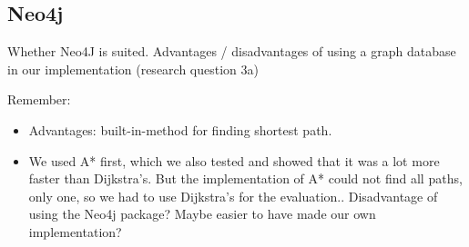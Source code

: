 \subsection{Neo4j}

Whether Neo4J is suited. Advantages / disadvantages of using a graph database in our implementation (research question 3a)

Remember:
\begin{itemize}
\item Advantages: built-in-method for finding shortest path.
\item We used A* first, which we also tested and showed that it was a lot more faster than Dijkstra's. But the implementation of A* could not find all paths, only one, so we had to use Dijkstra's for the evaluation.. Disadvantage of using the Neo4j package? Maybe easier to have made our own implementation?
\end{itemize}